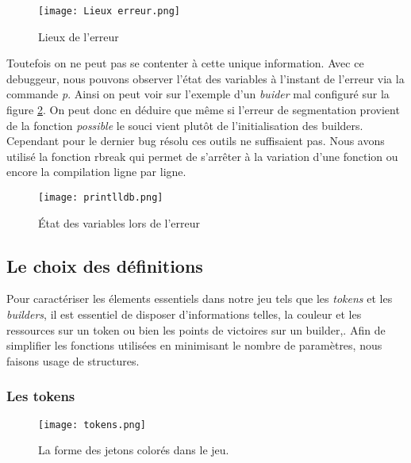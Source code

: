 \documentclass{article}
\begin{document}
\begin{figure}[ht]
    \centering
    \texttt{[image: Lieux erreur.png]}
    \caption{Lieux de l'erreur}
    \label{fig:lieux erreur}
\end{figure}

Toutefois on ne peut pas se contenter à cette unique information. Avec ce debuggeur, nous pouvons observer l'état des variables à l'instant de l'erreur via la commande \emph{p}. Ainsi on peut voir sur l'exemple d'un \emph{buider} mal configuré sur la figure \ref{fig:print lldb}. On peut donc en déduire que même si l'erreur de segmentation provient de la fonction \emph{possible} le souci vient plutôt de l'initialisation des builders. Cependant pour le dernier bug résolu ces outils ne suffisaient pas. Nous avons utilisé la fonction rbreak qui permet de s'arrêter à la variation d'une fonction ou encore la compilation ligne par ligne. 


\begin{figure}[ht]
    \centering
    \texttt{[image: printlldb.png]}
    \caption{État des variables lors de l'erreur}
    \label{fig:print lldb}
\end{figure}



\subsection{Le choix des définitions}

\vspace{1em}

\hspace{1em}Pour caractériser les élements essentiels dans notre jeu tels que les \emph{tokens} et les \emph{builders}, il est essentiel de disposer d'informations telles, la couleur et les ressources sur un token ou bien les points de victoires  sur un builder,. Afin de simplifier les fonctions utilisées en minimisant le nombre de paramètres, nous faisons usage de structures.

\subsubsection{Les tokens}

\begin{figure}[ht]
    \centering
    \texttt{[image: tokens.png]}
    \caption{La forme des jetons colorés dans le jeu.}
    \label{fig: LA FORME DES TOKENS  }
\end{figure}
\end{document}
